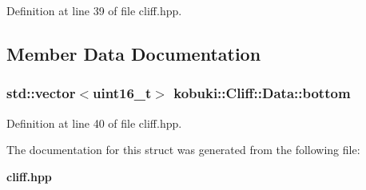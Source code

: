 \-Definition at line 39 of file cliff.\-hpp.



\subsection{\-Member \-Data \-Documentation}
\subsubsection[{bottom}]{\setlength{\rightskip}{0pt plus 5cm}std\-::vector$<$uint16\-\_\-t$>$ {\bf kobuki\-::\-Cliff\-::\-Data\-::bottom}}\label{structkobuki_1_1Cliff_1_1Data_addf367ef49803e8814f0e468d87b78ac}


\-Definition at line 40 of file cliff.\-hpp.



\-The documentation for this struct was generated from the following file\-:\begin{DoxyCompactItemize}
\item 
{\bf cliff.\-hpp}\end{DoxyCompactItemize}
